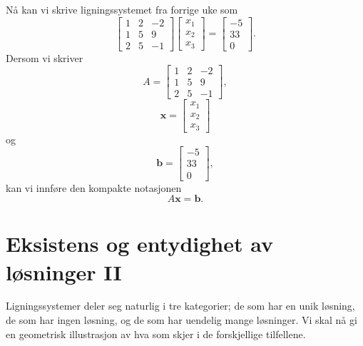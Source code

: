\noindent Nå kan vi skrive ligningssystemet fra forrige uke som
\begin{equation*}
\begin{bmatrix}
1  &  2  &  -2   \\
1  & 5  &  9  \\
2  & 5  &  -1  
\end{bmatrix}
\begin{bmatrix}
x_1   \\
x_2 \\
x_3 
\end{bmatrix}=
\begin{bmatrix}
-5   \\
33 \\
0 
\end{bmatrix}.
\end{equation*}
Dersom vi skriver 
\begin{equation*}
A=
\begin{bmatrix}
1  &  2  &  -2   \\
1  & 5  &  9  \\
2  & 5  &  -1  
\end{bmatrix},
\end{equation*}
\begin{equation*}
\mathbf{x}=
\begin{bmatrix}
x_1  \\
x_2 \\
x_3
\end{bmatrix}
\end{equation*}
og
\begin{equation*}
\mathbf{b}=
\begin{bmatrix}
-5   \\
33 \\
0 
\end{bmatrix},
\end{equation*} 
kan vi innføre den kompakte notasjonen
\begin{equation*}
A\mathbf{x}=\mathbf{b}.
\end{equation*}

\section*{Eksistens og entydighet av løsninger II}
Ligningssystemer deler seg naturlig i tre kategorier; de som har en unik løsning, de som har ingen løsning, og de som har uendelig mange løsninger. Vi skal nå gi en geometrisk illustrasjon av hva som skjer i de forskjellige  tilfellene. 

